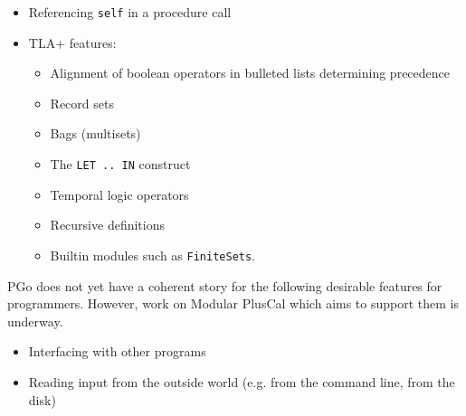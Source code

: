 \begin{itemize}
\item Referencing \lstinline[language=pcal]|self| in a procedure call

\item TLA+ features:

	\begin{itemize}
	\item Alignment of boolean operators in bulleted lists determining precedence
	
	\item Record sets
	
	\item Bags (multisets)
	
	\item The \lstinline[language=pcal]|LET .. IN| construct
	
	\item Temporal logic operators
	
	\item Recursive definitions

	\item Builtin modules such as \lstinline[language=pcal]|FiniteSets|.
	\end{itemize}
\end{itemize}

PGo does not yet have a coherent story for the following desirable features for programmers. However, work on Modular PlusCal which aims to support them is underway.

\begin{itemize}
\item Interfacing with other programs

\item Reading input from the outside world (e.g. from the command line, from the disk)
\end{itemize}
